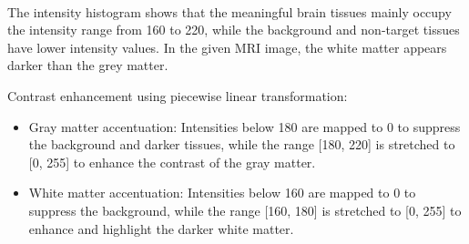 \documentclass[11pt]{article}
\providecommand{\tightlist}{%
      \setlength{\itemsep}{0pt}\setlength{\parskip}{0pt}}
\begin{document}
    \begin{center}
    \end{center}
    { \hspace*{\fill} \\}
    
    The intensity histogram shows that the meaningful brain tissues mainly
occupy the intensity range from 160 to 220, while the background and
non-target tissues have lower intensity values. In the given MRI image,
the white matter appears darker than the grey matter.

Contrast enhancement using piecewise linear transformation:

\begin{itemize}
\tightlist
\item
  Gray matter accentuation: Intensities below 180 are mapped to 0 to
  suppress the background and darker tissues, while the range {[}180,
  220{]} is stretched to {[}0, 255{]} to enhance the contrast of the
  gray matter.
\item
  White matter accentuation: Intensities below 160 are mapped to 0 to
  suppress the background, while the range {[}160, 180{]} is stretched
  to {[}0, 255{]} to enhance and highlight the darker white matter.
\end{itemize}
\end{document}
